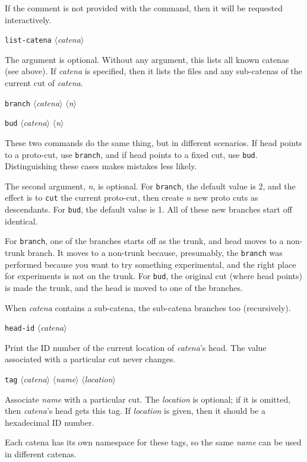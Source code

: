 \documentclass[10pt]{article}
\newcommand{\itarg}[1]{\textit{$\langle$#1$\rangle$}}
\begin{document}
{\begin{hang}
If the comment is not provided with the command, then it will be
requested interactively.
\end{hang}

{\tt list-catena} \itarg{catena}
\begin{hang}
The argument is optional. Without any argument, this lists all known
catenas (see above). If {\it catena} is specified, then it lists the
files and any sub-catenas of the current cut of {\it catena}.
\end{hang}

{\tt branch} \itarg{catena} \itarg{n}

{\tt bud} \itarg{catena} \itarg{n}
\begin{hang}
These two commands do the same thing, but in different scenarios. If
head points to a proto-cut, use {\tt branch}, and if head points to a
fixed cut, use {\tt bud}. Distinguishing these cases makes mistakes
less likely.
  
The second argument, {\it n}, is optional. For {\tt branch}, the
default value is 2, and the effect is to {\tt cut} the current
proto-cut, then create {\it n} new proto cuts as descendants. For {\tt bud}, 
the default value is 1. All of these new branches start off identical.

For {\tt branch}, one of the branches starts off as the trunk, and
head moves to a non-trunk branch. It moves to a non-trunk because,
presumably, the {\tt branch} was performed because you want to try
something experimental, and the right place for experiments is not on
the trunk. For {\tt bud}, the original cut (where head points) is made
the trunk, and the head is moved to one of the branches.
  
When {\it catena} contains a sub-catena, the sub-catena branches
too (recursively).
\end{hang}

{\tt head-id} \itarg{catena}
\begin{hang}
Print the ID number of the current location of {\it catena}'s
head. The value associated with a particular cut never changes.
\end{hang}

{\tt tag} \itarg{catena} \itarg{name} \itarg{location}
\begin{hang}
Associate {\it name} with a particular cut. The {\it location} is
optional; if it is omitted, then {\it catena}'s head gets this
tag. If {\it location} is given, then it should be a hexadecimal ID
number.

Each catena has its own namespace for these tags, so the same
{\it name} can be used in different catenas. 
\end{hang}
  
}
\end{document}
